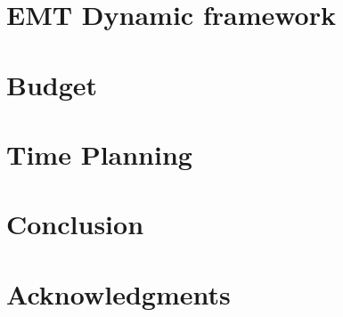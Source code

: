 \documentclass[a4paper, 11pt, titlepage, twoside]{article}
\begin{document}
\section{EMT Dynamic framework}\label{EMT}

\newpage


\newpage

\cleardoublepage
\section{Budget}


\cleardoublepage
\section{Time Planning}


\section{Conclusion}\label{Conclusion}

\newpage

\section*{Acknowledgments}\label{acknow} 


\appendix
\cleardoublepage

\cleardoublepage
\printbibliography
\end{document}
